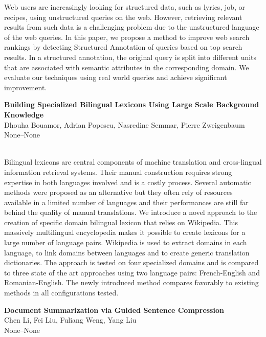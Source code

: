 \documentclass[twoside,makeidx]{book}
\begin{document}
\nopagebreak%
\noindent%
{\small Web users are increasingly looking for structured data, such as lyrics, job, or recipes, using unstructured queries on the web. However, retrieving relevant results from such data is a challenging problem due to the unstructured language of the web queries. In this paper, we propose a method to improve web search rankings by detecting Structured Annotation of queries based on top search results. In a structured annotation, the original query is split into different units that are associated with semantic attributes in the corresponding domain. We evaluate our techniques using real world queries and achieve significant improvement.}
\par\vspace{2em}\noindent%
\begin{minipage}{\linewidth}%
\begin{center}
\textbf{\normalsize Building Specialized Bilingual Lexicons Using Large Scale Background Knowledge}\\
\normalsize  Dhouha Bouamor,  Adrian Popescu,  Nasredine Semmar,  Pierre Zweigenbaum\\
{\small None--None}\\
\end{center}
\end{minipage}\\[0.5em]
\nopagebreak%
\noindent%
{\small Bilingual lexicons are central components of machine translation and cross-lingual information retrieval systems.  Their manual construction requires strong expertise in both languages involved and is a costly process.  Several automatic methods were proposed as an alternative but they often rely of resources available in a limited number of languages and their performances are still far behind the quality of manual translations. We introduce a novel approach to the creation of specific domain bilingual lexicon that relies on Wikipedia. This massively multilingual encyclopedia makes it possible to create lexicons for a large number of language pairs.  Wikipedia is used to extract domains in each language, to link domains between languages and to create generic translation dictionaries.  The approach is tested on four specialized domains and is compared to three state of the art approaches using two language pairs: French-English and Romanian-English.  The newly introduced method compares favorably to existing methods in all configurations tested.}
\par\vspace{2em}\noindent%
\begin{minipage}{\linewidth}%
\begin{center}
\textbf{\normalsize Document Summarization via Guided Sentence Compression}\\
\normalsize  Chen Li,  Fei Liu,  Fuliang Weng,  Yang Liu\\
{\small None--None}\\
\end{center}
\end{minipage}\\[0.5em]
\end{document}
